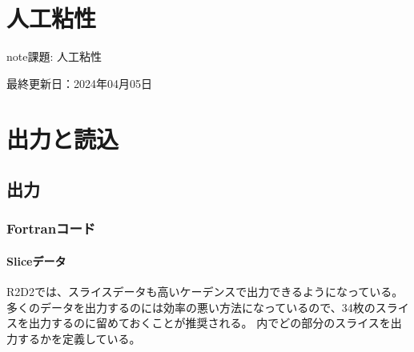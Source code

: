 \documentclass[letterpaper,10pt,dvipdfmx,report]{sphinxmanual}
\begin{document}
\sphinxstepscope


\chapter{人工粘性}
\label{\detokenize{artdif:id1}}\label{\detokenize{artdif::doc}}
\begin{sphinxadmonition}{note}{\label{\detokenize{artdif:id2}}課題:}
\sphinxAtStartPar
人工粘性
\end{sphinxadmonition}

\sphinxAtStartPar
最終更新日：2024年04月05日

\sphinxstepscope


\chapter{出力と読込}
\label{\detokenize{io:id1}}\label{\detokenize{io::doc}}

\section{出力}
\label{\detokenize{io:id2}}

\subsection{Fortranコード}
\label{\detokenize{io:fortran}}

\subsubsection{Sliceデータ}
\label{\detokenize{io:slice}}
\sphinxAtStartPar
R2D2では、スライスデータも高いケーデンスで出力できるようになっている。多くのデータを出力するのには効率の悪い方法になっているので、3\sphinxhyphen{}4枚のスライスを出力するのに留めておくことが推奨される。  内でどの部分のスライスを出力するかを定義している。

\begin{sphinxVerbatim}[commandchars=\\\{\}]
\end{sphinxVerbatim}
\end{document}
